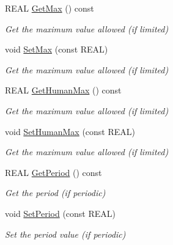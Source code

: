 \begin{Indent}
\begin{DoxyCompactItemize}
R\+E\+AL \mbox{\hyperlink{class_obj_cryst_1_1_refinable_par_ab29c440d745f91d1c89bf817169e42db}{Get\+Max}} () const
\begin{DoxyCompactList}\small\item\em Get the maximum value allowed (if limited) \end{DoxyCompactList}\item 
\mbox{\label{class_obj_cryst_1_1_refinable_par_a33f45d527d405da957ddc513e5a3099f}} 
void \mbox{\hyperlink{class_obj_cryst_1_1_refinable_par_a33f45d527d405da957ddc513e5a3099f}{Set\+Max}} (const R\+E\+AL)
\begin{DoxyCompactList}\small\item\em Get the maximum value allowed (if limited) \end{DoxyCompactList}\item 
\mbox{\label{class_obj_cryst_1_1_refinable_par_a9f6dea30f0faaaa765e2a2a934e4f86c}} 
R\+E\+AL \mbox{\hyperlink{class_obj_cryst_1_1_refinable_par_a9f6dea30f0faaaa765e2a2a934e4f86c}{Get\+Human\+Max}} () const
\begin{DoxyCompactList}\small\item\em Get the maximum value allowed (if limited) \end{DoxyCompactList}\item 
\mbox{\label{class_obj_cryst_1_1_refinable_par_ade6c83881319be43feb679b4896766bd}} 
void \mbox{\hyperlink{class_obj_cryst_1_1_refinable_par_ade6c83881319be43feb679b4896766bd}{Set\+Human\+Max}} (const R\+E\+AL)
\begin{DoxyCompactList}\small\item\em Get the maximum value allowed (if limited) \end{DoxyCompactList}\item 
\mbox{\label{class_obj_cryst_1_1_refinable_par_af304d39bdb932e0d25e0c41c13ba97a8}} 
R\+E\+AL \mbox{\hyperlink{class_obj_cryst_1_1_refinable_par_af304d39bdb932e0d25e0c41c13ba97a8}{Get\+Period}} () const
\begin{DoxyCompactList}\small\item\em Get the period (if periodic) \end{DoxyCompactList}\item 
\mbox{\label{class_obj_cryst_1_1_refinable_par_a97b23ea6b624bbe517c29b5ef00b5f5b}} 
void \mbox{\hyperlink{class_obj_cryst_1_1_refinable_par_a97b23ea6b624bbe517c29b5ef00b5f5b}{Set\+Period}} (const R\+E\+AL)
\begin{DoxyCompactList}\small\item\em Set the period value (if periodic) \end{DoxyCompactList}\end{DoxyCompactItemize}
\end{Indent}
